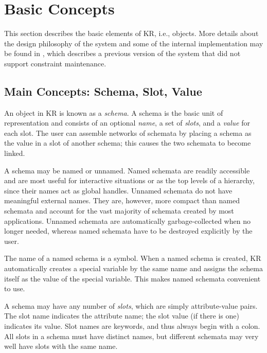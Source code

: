 \chapter{Basic Concepts}
\value{top}

This section describes the basic elements of KR, i.e., objects.  More
details about the design philosophy of the system and some of the
internal implementation may be found in \cite{KR}, which describes a
previous version of the system that did not support constraint
maintenance.


\section{Main Concepts: Schema, Slot, Value}
\value{s-top}

An object in KR is known as a {\it schema}.  A schema is the
basic unit of representation and consists of an optional {\it name}, a
set of {\it slots}, and a {\it value} for each slot.  The user can
assemble networks of schemata by placing a schema as the value in a slot of
another schema; this causes the two schemata to become linked.

A schema may be named or
unnamed.  Named schemata are readily accessible and are most useful
for interactive situations or as the top levels of a hierarchy, since
their names act as global handles.  Unnamed schemata do not have meaningful external names.  They are, however,
more compact than named schemata and account for the vast majority of
schemata created by most applications.  Unnamed schemata are
automatically garbage-collected when no longer needed, whereas named
schemata have to be destroyed explicitly by the user.

The name of a named schema is a symbol.  When a named schema is created, KR
automatically creates a special variable by the same name  and assigns the schema itself as the value of the special
variable.  This makes named schemata convenient to use.

A schema may have any number of {\it slots}, which are simply
 attribute-value pairs.  The slot name indicates the
attribute name; the slot value (if there is one) indicates its value.  Slot
names  are keywords, and thus always begin with a
colon.  All slots in a schema must have distinct names, but different
schemata may very well have slots with the same name.

